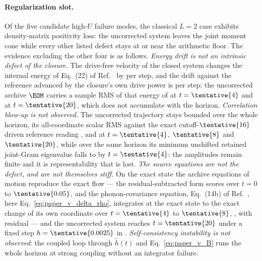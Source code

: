 \paragraph*{Regularization slot.}
Of the five candidate high-\(U\) failure modes, the classical \(L=2\) case
exhibits density-matrix positivity loss: the uncorrected system leaves the
joint moment cone while every other listed defect stays at or near the
arithmetic floor.  The evidence excluding the other four is as follows.
\emph{Energy drift is not an intrinsic defect of the closure.}  The drive-free
velocity of the closed system changes the internal energy of Eq.~(22) of
Ref.~\cite{RivaSimoniPing2026} by  per step,
and the drift against the reference advanced by the closure's own drive power
is  per step; the uncorrected archive
\(\EOM\) carries a sample RMS of that energy of
 at \(t=\tentative{4}\) and
 at \(t=\tentative{20}\), which does not
accumulate with the horizon.  \emph{Correlation blow-up is not observed.}  The
uncorrected trajectory stays bounded over the whole horizon, its
all-coordinate scalar RMS against the exact cutoff-\(\tentative{16}\) driven
reference reading ,
 and  at
\(t=\tentative{4}\), \(\tentative{8}\) and \(\tentative{20}\), while over the
same horizon its minimum unshifted retained joint-Gram eigenvalue falls to
 by \(t=\tentative{4}\): the amplitudes
remain finite and it is representability that is lost.  \emph{The source
equations are not the defect, and are not themselves stiff.}  On the exact
state the archive equations of motion reproduce the exact flow --- the
residual-subtracted form scores  over
\(t=0\) to \(\tentative{0.05}\), and the phonon-covariance equation, Eq.~(14b)
of Ref.~\cite{RivaSimoniPing2026}, here Eq.~\eqref{eq:paper_v_delta_rho},
integrates at the exact state to the exact change of its own coordinate over
\(t=\tentative{4}\) to \(\tentative{8}\),
, with residual
 --- and the uncorrected system reaches
\(t=\tentative{20}\) under a fixed step \(h=\tentative{0.0025}\) in
.  \emph{Self-consistency instability is not
observed}: the coupled loop through \(\tilde h(t)\) and
Eq.~\eqref{eq:paper_v_B} runs the whole horizon at strong coupling without an
integrator failure.

